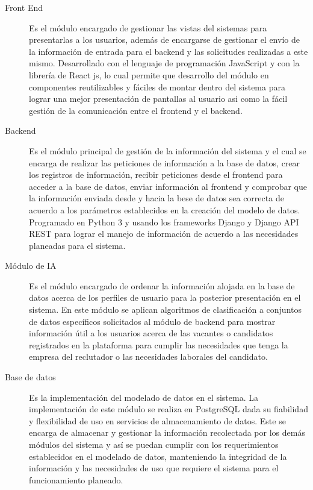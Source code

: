 \begin{description}
   \item[Front End]  Es el módulo encargado de gestionar las vistas del sistemas para presentarlas a los usuarios, además de encargarse de gestionar el envío de la información de entrada
   para el backend y las solicitudes realizadas a este mismo. Desarrollado con el lenguaje de programación JavaScript y con la librería de React js, lo cual permite
   que desarrollo del módulo en componentes reutilizables y fáciles de montar dentro del sistema para lograr una mejor presentación de pantallas al usuario asi como
   la fácil gestión de la comunicación entre el frontend y el backend.
   
   \item[Backend] Es el módulo principal de gestión de la información del sistema y el cual se encarga de realizar las peticiones de información a la base de datos, crear los registros
   de información, recibir peticiones desde el frontend para acceder a la base de datos, enviar información al frontend y comprobar que la información enviada desde y
   hacia la bese de datos sea correcta de acuerdo a los parámetros establecidos en la creación del modelo de datos. Programado en Python 3 y usando los frameworks Django
   y Django API REST para lograr el manejo de información de acuerdo a las necesidades planeadas para el sistema.
   
   \item[Módulo de IA] Es el módulo encargado de ordenar la información alojada en la base de datos acerca de los perfiles de usuario para la posterior presentación en el sistema. En este
   módulo se aplican algoritmos de clasificación a conjuntos de datos específicos solicitados al módulo de backend para mostrar información útil a los usuarios acerca de
   las vacantes o candidatos registrados en la plataforma para cumplir las necesidades que tenga la empresa del reclutador o las necesidades laborales del candidato.
   
   
   \item[Base de datos] Es la implementación del modelado de datos en el sistema. La implementación de este módulo se realiza en PostgreSQL dada su fiabilidad y flexibilidad de uso en servicios
   de almacenamiento de datos. Este se encarga de almacenar y gestionar la información recolectada por los demás módulos del sistema y así se puedan cumplir con los
   requerimientos establecidos en el modelado de datos, manteniendo la integridad de la información y las necesidades de uso que requiere el sistema para el  funcionamiento
   planeado.
   
\end{description}